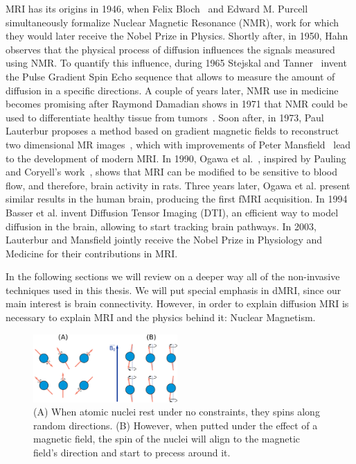 MRI has its origins in 1946, when Felix Bloch~\cite{Bloch1946} and Edward M.
Purcell~\cite{Purcell1946} simultaneously formalize Nuclear Magnetic Resonance
(NMR), work for which they would later receive the Nobel Prize in Physics. Shortly
after, in 1950, Hahn~\cite{Hahn1950} observes that the physical process of diffusion
influences the signals measured using NMR. To quantify this influence,
during 1965 Stejskal and Tanner~\cite{Stejskal1965} invent the Pulse Gradient
Spin Echo sequence that allows to measure the amount of diffusion in a specific
directions. A couple of years later, NMR use in medicine becomes promising after
Raymond Damadian shows in 1971 that NMR could be used to differentiate healthy
tissue from tumors~\cite{Reichson1971}. Soon after, in 1973, Paul Lauterbur
proposes a method based on gradient magnetic fields to reconstruct two
dimensional MR images~\cite{Lauterbur1973}, which with improvements of Peter
Mansfield~\cite{Mansfield1977} lead to the development of modern MRI. In 1990,
Ogawa et al.~\cite{Ogawa1993}, inspired by Pauling and Coryell's work~\cite{Pauling1936},
shows that MRI can be modified to be sensitive to blood flow, and therefore,
brain activity in rats. Three years later, Ogawa et al.\cite{Ogawa1990} present
similar results in the human brain, producing the first fMRI acquisition. In
1994 Basser et al. \cite{Basser1994} invent Diffusion Tensor Imaging (DTI), an
efficient way to model diffusion in the brain, allowing to start tracking
brain pathways. In 2003, Lauterbur and Mansfield jointly receive
the Nobel Prize in Physiology and Medicine for their contributions in MRI.

In the following sections we will review on a deeper way all of the non-invasive
techniques used in this thesis. We will put special emphasis in dMRI, since our
main interest is brain connectivity. However, in order to explain diffusion MRI
is necessary to explain MRI and the physics behind it: Nuclear Magnetism.

\begin{figure}[h]
\includegraphics[width=0.49\textwidth]{3.mri/img/spin.png}
\caption{(A) When atomic nuclei rest under no constraints, they spins along
         random directions. (B) However, when putted under the effect of a
         magnetic field, the spin of the nuclei will align to the magnetic
         field's direction and start to precess around it.}
\label{fig:spin}
\end{figure} 

